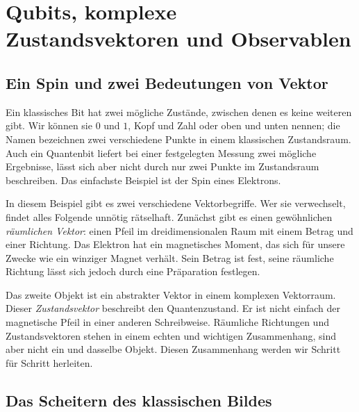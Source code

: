 \chapter{Qubits, komplexe Zustandsvektoren und Observablen}


\section{Ein Spin und zwei Bedeutungen von Vektor}

Ein klassisches Bit hat zwei mögliche Zustände, zwischen denen es keine weiteren gibt. Wir können sie \(0\) und \(1\), Kopf und Zahl oder oben und unten nennen; die Namen bezeichnen zwei verschiedene Punkte in einem klassischen Zustandsraum. Auch ein Quantenbit liefert bei einer festgelegten Messung zwei mögliche Ergebnisse, lässt sich aber nicht durch nur zwei Punkte im Zustandsraum beschreiben. Das einfachste Beispiel ist der Spin eines Elektrons.

In diesem Beispiel gibt es zwei verschiedene Vektorbegriffe. Wer sie verwechselt, findet alles Folgende unnötig rätselhaft. Zunächst gibt es einen gewöhnlichen \emph{räumlichen Vektor}: einen Pfeil im dreidimensionalen Raum mit einem Betrag und einer Richtung. Das Elektron hat ein magnetisches Moment, das sich für unsere Zwecke wie ein winziger Magnet verhält. Sein Betrag ist fest, seine räumliche Richtung lässt sich jedoch durch eine Präparation festlegen.

Das zweite Objekt ist ein abstrakter Vektor in einem komplexen Vektorraum. Dieser \emph{Zustandsvektor} beschreibt den Quantenzustand. Er ist nicht einfach der magnetische Pfeil in einer anderen Schreibweise. Räumliche Richtungen und Zustandsvektoren stehen in einem echten und wichtigen Zusammenhang, sind aber nicht ein und dasselbe Objekt. Diesen Zusammenhang werden wir Schritt für Schritt herleiten.

\section{Das Scheitern des klassischen Bildes}


